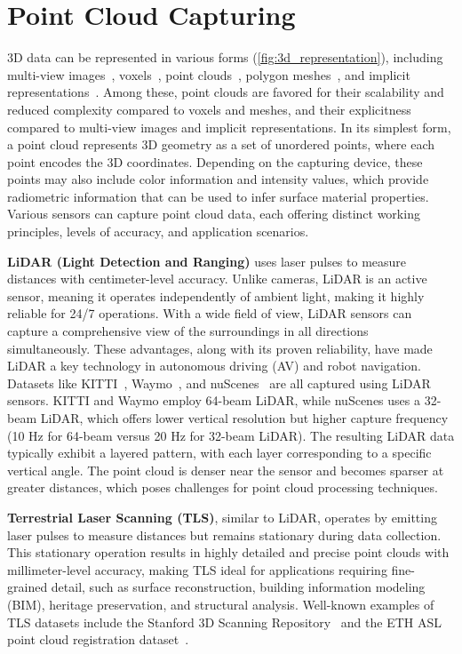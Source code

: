 \section{Point Cloud Capturing}
\label{sec:bg_pc_caputure}
3D data can be represented in various forms (\cf \cref{fig:3d_representation}), including multi-view images~\cite{su2015multi,qi2016volumetric}, voxels~\cite{wu20153d,maturana2015voxnet}, point clouds~\cite{qi2017pointnet,wang2019dynamic}, polygon meshes~\cite{hanocka2019meshcnn,NEURIPS2020_0a656cc1}, and implicit representations~\cite{mescheder2019occupancy,park2019deepsdf,chen2019learning,yang2021geometry}. Among these, point clouds are favored for their scalability and reduced complexity compared to voxels and meshes, and their explicitness compared to multi-view images and implicit representations. In its simplest form, a point cloud represents 3D geometry as a set of unordered points, where each point encodes the 3D coordinates. Depending on the capturing device, these points may also include color information and intensity values, which provide radiometric information that can be used to infer surface material properties. Various sensors can capture point cloud data, each offering distinct working principles, levels of accuracy, and application scenarios.

\textbf{LiDAR (Light Detection and Ranging)} uses laser pulses to measure distances with centimeter-level accuracy. Unlike cameras, LiDAR is an active sensor, meaning it operates independently of ambient light, making it highly reliable for 24/7 operations. With a wide field of view, LiDAR sensors can capture a comprehensive view of the surroundings in all directions simultaneously. These advantages, along with its proven reliability, have made LiDAR a key technology in autonomous driving (AV) and robot navigation. Datasets like KITTI~\cite{geiger2012we}, Waymo~\cite{sun2020scalability}, and nuScenes~\cite{caesar2020nuscenes} are all captured using LiDAR sensors. KITTI and Waymo employ 64-beam LiDAR, while nuScenes uses a 32-beam LiDAR, which offers lower vertical resolution but higher capture frequency (10 Hz for 64-beam versus 20 Hz for 32-beam LiDAR). The resulting LiDAR data typically exhibit a layered pattern, with each layer corresponding to a specific vertical angle. The point cloud is denser near the sensor and becomes sparser at greater distances, which poses challenges for point cloud processing techniques.

\textbf{Terrestrial Laser Scanning (TLS)}, similar to LiDAR, operates by emitting laser pulses to measure distances but remains stationary during data collection. This stationary operation results in highly detailed and precise point clouds with millimeter-level accuracy, making TLS ideal for applications requiring fine-grained detail, such as surface reconstruction, building information modeling (BIM), heritage preservation, and structural analysis. Well-known examples of TLS datasets include the Stanford 3D Scanning Repository~\cite{curless1996volumetric} and the ETH ASL point cloud registration dataset~\cite{Pomerleau_2012}.

